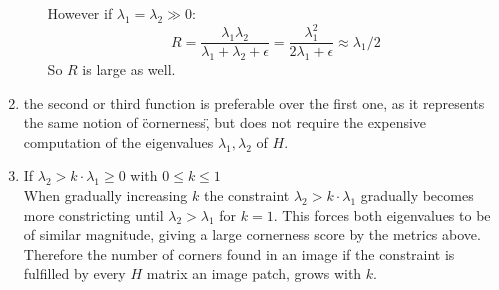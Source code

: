 \documentclass[12pt,letterpaper]{article}
\begin{document}
\begin{enumerate}[label=(\alph*)]
\begin{enumerate}
       However if \( \lambda_1 = \lambda_2 \gg 0 \):
        \begin{equation}
            R 
            = \frac{\lambda_1 \lambda_2}{\lambda_1 + \lambda_2 + \epsilon}
            = \frac{\lambda_1^2}{2\lambda_1 + \epsilon}
            \approx \lambda_1 / 2
        \end{equation}
        So \( R \) is large as well.
    \end{enumerate}
    \item the second or third function is preferable over the first one, as it represents the same notion of \"cornerness\", 
    but does not require the expensive computation of the eigenvalues \( \lambda_1, \lambda_2 \) of \( H \).
    \item If \( \lambda_2 > k \cdot \lambda_1 \geq 0 \) with \( 0 \leq k \leq 1 \) \\
        When gradually increasing \( k \) the constraint \( \lambda_2 > k \cdot \lambda_1 \) gradually becomes more
        constricting until \( \lambda_2 > \lambda_1 \) for \( k = 1 \). This forces both eigenvalues 
        to be of similar magnitude, giving a large cornerness score by the metrics above.
        Therefore the number of corners found in an image if the constraint is fulfilled by every \( H \) matrix an image patch,
        grows with \( k \).
\end{enumerate}
\end{document}
